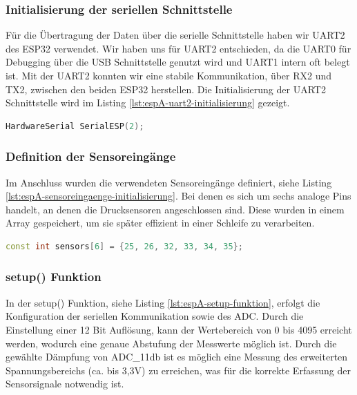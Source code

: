 \subsubsection{Initialisierung der seriellen Schnittstelle}
Für die Übertragung der Daten über die serielle Schnittstelle haben wir UART2 des ESP32 verwendet. Wir haben uns für UART2 entschieden, da die UART0 für Debugging über die USB Schnittstelle genutzt wird und UART1 intern oft belegt ist. Mit der UART2 konnten wir eine stabile Kommunikation, über RX2 und TX2, zwischen den beiden ESP32 herstellen. 
Die Initialisierung der UART2 Schnittstelle wird im Listing \ref{lst:espA-uart2-initialisierung} gezeigt.

\begin{lstlisting}[language=C++, caption={UART2 Initialisierung}, label={lst:espA-uart2-initialisierung}, firstnumber=4]
HardwareSerial SerialESP(2); 
\end{lstlisting}

\subsubsection{Definition der Sensoreingänge}
Im Anschluss wurden die verwendeten Sensoreingänge definiert, siehe Listing \ref{lst:espA-sensoreingaenge-initialisierung}. Bei denen es sich um sechs analoge Pins handelt, an denen die Drucksensoren angeschlossen sind. Diese wurden in einem Array gespeichert, um sie später effizient in einer Schleife zu verarbeiten.

\begin{lstlisting}[language=C++, caption={Initialisierung der Sensoreingänge}, label={lst:espA-sensoreingaenge-initialisierung}, firstnumber=7]
const int sensors[6] = {25, 26, 32, 33, 34, 35};
\end{lstlisting}

\subsubsection{setup() Funktion}
In der setup() Funktion, siehe Listing \ref{lst:espA-setup-funktion}, erfolgt die Konfiguration der seriellen Kommunikation sowie des ADC. Durch die Einstellung einer 12 Bit Auflösung, kann der Wertebereich von 0 bis 4095 erreicht werden, wodurch eine genaue Abstufung der Messwerte möglich ist. Durch die gewählte Dämpfung von ADC\_11db ist es möglich eine Messung des erweiterten Spannungsbereichs (ca. bis 3,3V) zu erreichen, was für die korrekte Erfassung der Sensorsignale notwendig ist.

